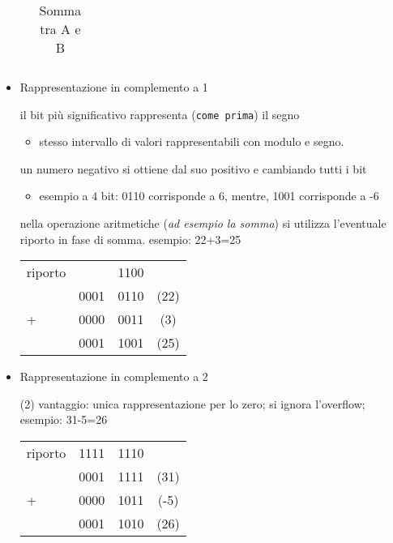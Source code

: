 \documentclass{book}
\begin{document}
\begin{itemize}
\begin{itemize}
\begin{table}[h!]
\begin{tabular}{l|ccc|}
					\end{tabular}
					\caption {Somma tra A e B}
				\end{table}
		\end{itemize}
	\item Rappresentazione in complemento a 1
		\begin{tasks}
			\task il bit più significativo rappresenta ({\tt come prima}) il
			segno
			\begin{itemize}
				\item stesso intervallo di valori rappresentabili con modulo e
					segno.
			\end{itemize}
			\task un numero negativo si ottiene dal suo positivo e cambiando
			tutti i bit
			\begin{itemize}
				\item esempio a 4 bit: 0110 corrisponde a 6, mentre, 1001
					corrisponde a -6
			\end{itemize}
			\task nella operazione aritmetiche (\textit{ad esempio la somma})
			si utilizza l'eventuale riporto in fase di somma.
			\task esempio: 22+3=25
			\begin{center}
				\begin{tabular}{lccc}
					riporto&&{\color{red}1100}\\
					&0001&0110&(22)\\
					+&0000&0011&(3)\\\hline
					&0001&1001&(25)
				\end{tabular}
			\end{center}
		\end{tasks}
	\item Rappresentazione in complemento a 2
	\begin{tasks}(2)
		\task vantaggio: unica rappresentazione per lo zero;
		\task si ignora l'overflow;
		\task esempio: 31-5=26
			\begin{center}
				\begin{tabular}{lccc}
					riporto&{\color{red}1111}&{\color{red}1110}\\
					&0001&1111&(31)\\
					+&0000&1011&(-5)\\\hline
					&0001&1010&(26)
				\end{tabular}
			\end{center}
	\end{tasks}
\end{itemize}
\end{document}
